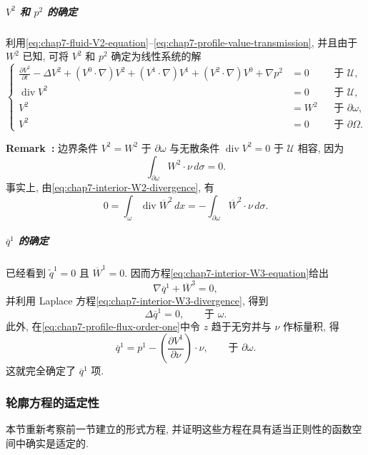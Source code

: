 \begin{sloppypar}
\subparagraph{$V^2$ 和 $p^2$ 的确定}

利用\eqref{eq:chap7-fluid-V2-equation}--\eqref{eq:chap7-profile-value-transmission}, 并且由于 $W^2$ 已知, 可将 $V^2$ 和 $p^2$ 确定为线性系统的解
\[
\left\{
\begin{aligned}
 \frac{\partial V^2}{\partial t}-\Delta V^2+(V^0\cdot\nabla)V^2
 +(V^1\cdot\nabla)V^1+(V^2\cdot\nabla)V^0+\nabla p^2&=0&&\text{于 }\mathcal U,\\
 \operatorname{div}V^2&=0&&\text{于 }\mathcal U,\\
 V^2&=W^2&&\text{于 }\partial\omega,\\
 V^2&=0&&\text{于 }\partial\Omega.
\end{aligned}
\right.
\]

\par\noindent{}\textbf{Remark~\thechaptersevensectiontworemark:}\label{rem:chap7-V2-boundary-compatibility}
边界条件 $V^2=W^2$ 于 $\partial\omega$ 与无散条件 $\operatorname{div}V^2=0$ 于 $\mathcal U$ 相容, 因为
\[
 \int_{\partial\omega}W^2\cdot\nu\,d\sigma=0.
\]
事实上, 由\eqref{eq:chap7-interior-W2-divergence}, 有
\[
 0=\int_\omega\operatorname{div}\overline W^2\,dx
 =-\int_{\partial\omega}\overline W^2\cdot\nu\,d\sigma.
\]

\subparagraph{$\overline q^1$ 的确定}

已经看到 $\widetilde q^1=0$ 且 $\overline W^1=0$. 因而方程\eqref{eq:chap7-interior-W3-equation}给出
\[
 \nabla\overline q^1+\overline W^3=0,
\]
并利用 Laplace 方程\eqref{eq:chap7-interior-W3-divergence}, 得到
\begin{equation}
 \Delta\overline q^1=0,\qquad\text{于 }\omega.
\label{eq:chap7-q1-harmonic}
\end{equation}
此外, 在\eqref{eq:chap7-profile-flux-order-one}中令 $z$ 趋于无穷并与 $\nu$ 作标量积, 得
\begin{equation}
 \overline q^1=p^1-\left(\frac{\partial V^1}{\partial\nu}\right)\cdot\nu,
 \qquad\text{于 }\partial\omega.
\label{eq:chap7-q1-boundary-value}
\end{equation}
这就完全确定了 $\overline q^1$ 项.

\subsubsection{轮廓方程的适定性}
\label{subsec:chap7-profile-wellposedness}

本节重新考察前一节建立的形式方程, 并证明这些方程在具有适当正则性的函数空间中确实是适定的.


\end{sloppypar}
